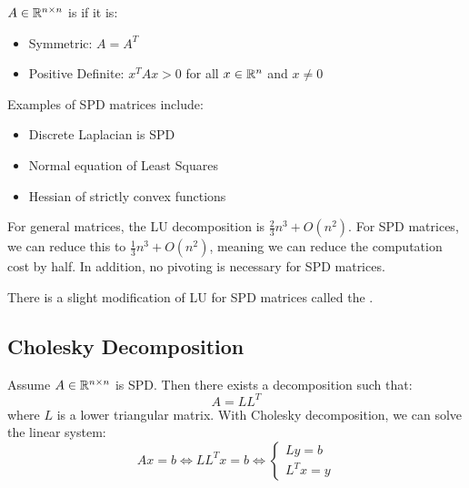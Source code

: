 \documentclass[../main/main.tex]{subfiles}
\begin{document}
  \begin{definition}
    $A \in\mathbb{R}^{n \times n}$ is  if it is:
    \begin{itemize}
\item Symmetric: $A = A^{T}$
            \item Positive Definite: $x^{T}Ax > 0$ for all $x \in \mathbb{R}^{n}$ and $x\neq 0$
    \end{itemize}
  \end{definition}
  \begin{example}
    Examples of SPD matrices include:
    \begin{itemize}
\item
    Discrete Laplacian is SPD
\item Normal equation of Least Squares
\item Hessian of strictly convex functions
    \end{itemize}
  \end{example}
  For general matrices, the LU decomposition is $\frac{2}{3}n^{3} + O(n^2)$. For SPD matrices, we can reduce this to $\frac{1}{3}n^{3} + O(n^2)$, meaning we can reduce the computation cost by half. In addition, no pivoting is necessary for SPD matrices.

  There is a slight modification of LU for SPD matrices called the .
  \subsection{Cholesky Decomposition}
  Assume $A \in \mathbb{R}^{n \times n}$ is SPD. Then there exists a decomposition such that: \[
A = L L ^{T}
  \]
  where $L$ is a lower triangular matrix. With Cholesky decomposition, we can solve the linear system: \[
  Ax = b \iff L L^{T}x = b \iff \begin{cases}
    Ly = b \\
    L^{T}x = y
  \end{cases}\]

\end{document}
